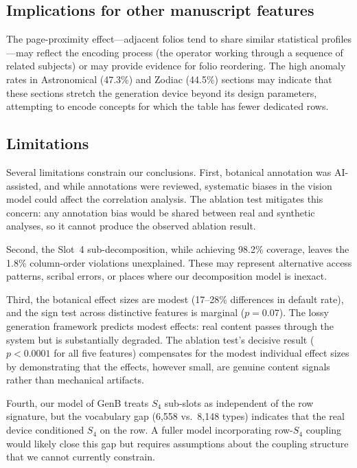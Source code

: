 \documentclass[12pt]{article}
\begin{document}
\subsection{Implications for other manuscript features}

The page-proximity effect---adjacent folios tend to share similar statistical profiles---may reflect the encoding process (the operator working through a sequence of related subjects) or may provide evidence for folio reordering. The high anomaly rates in Astronomical (47.3\%) and Zodiac (44.5\%) sections may indicate that these sections stretch the generation device beyond its design parameters, attempting to encode concepts for which the table has fewer dedicated rows.

\subsection{Limitations}

Several limitations constrain our conclusions. First, botanical annotation was AI-assisted, and while annotations were reviewed, systematic biases in the vision model could affect the correlation analysis. The ablation test mitigates this concern: any annotation bias would be shared between real and synthetic analyses, so it cannot produce the observed ablation result.

Second, the Slot~4 sub-decomposition, while achieving 98.2\% coverage, leaves the 1.8\% column-order violations unexplained. These may represent alternative access patterns, scribal errors, or places where our decomposition model is inexact.

Third, the botanical effect sizes are modest (17--28\% differences in default rate), and the sign test across distinctive features is marginal ($p = 0.07$). The lossy generation framework predicts modest effects: real content passes through the system but is substantially degraded. The ablation test's decisive result ($p < 0.0001$ for all five features) compensates for the modest individual effect sizes by demonstrating that the effects, however small, are genuine content signals rather than mechanical artifacts.

Fourth, our model of GenB treats $S_4$ sub-slots as independent of the row signature, but the vocabulary gap (6,558 vs.\ 8,148 types) indicates that the real device conditioned $S_4$ on the row. A fuller model incorporating row-$S_4$ coupling would likely close this gap but requires assumptions about the coupling structure that we cannot currently constrain.
\end{document}
